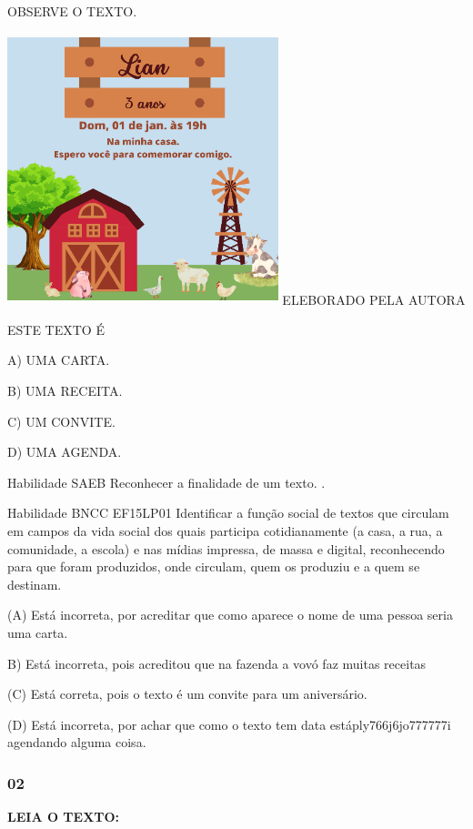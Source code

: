 OBSERVE O TEXTO.

\includegraphics[width=3.10106in,height=3.10106in]{media/image157.png}
ELEBORADO PELA AUTORA

ESTE TEXTO É

A) UMA CARTA.

B) UMA RECEITA.

C) UM CONVITE.

D) UMA AGENDA.

Habilidade SAEB Reconhecer a finalidade de um texto. .

Habilidade BNCC EF15LP01 Identificar a função social de textos que
circulam em campos da vida social dos quais participa cotidianamente (a
casa, a rua, a comunidade, a escola) e nas mídias impressa, de massa e
digital, reconhecendo para que foram produzidos, onde circulam, quem os
produziu e a quem se destinam.

(A) Está incorreta, por acreditar que como aparece o nome de uma pessoa
seria uma carta.

B) Está incorreta, pois acreditou que na fazenda a vovó faz muitas
receitas

(C) Está correta, pois o texto é um convite para um aniversário.

(D) Está incorreta, por achar que como o texto tem data
estáply766j6jo777777i agendando alguma
coisa.\protect\hypertarget{_heading=h.gz9yp347w1lz}{}{}

\subsubsection{02 }\label{section-13}

\textbf{LEIA O TEXTO:}

